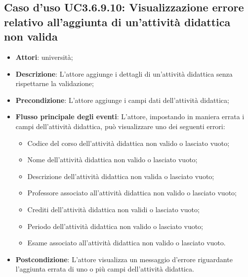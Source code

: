 \subsection{Caso d'uso \texorpdfstring{UC3.6.9.10}{UC3.6.9.10}: Visualizzazione errore relativo all’aggiunta di un’attività didattica non valida}
\begin{itemize}
\item \textbf{Attori}: università;
\item \textbf{Descrizione}: L'attore aggiunge i dettagli di un’attività didattica senza rispettarne la validazione;

\item \textbf{Precondizione}: L'attore aggiunge i campi dati dell’attività didattica;

\item \textbf{Flusso principale degli eventi}: L'attore, impostando in maniera errata i campi dell’attività didattica, può visualizzare uno dei seguenti errori:
\begin{itemize}
\item Codice del corso dell’attività didattica non valido o lasciato vuoto;
\item Nome dell’attività didattica non valido o lasciato vuoto;
\item Descrizione dell’attività didattica non valida o lasciato vuoto;
\item Professore associato all’attività didattica non valido o lasciato vuoto;
\item Crediti dell’attività didattica non validi o lasciato vuoto;
\item Periodo dell’attività didattica non valido o lasciato vuoto;
\item Esame associato all’attività didattica non valido o lasciato vuoto.
\end{itemize}
\item \textbf{Postcondizione}: L'attore visualizza un messaggio d'errore riguardante l'aggiunta errata di uno o più campi dell’attività didattica.

\end{itemize}
